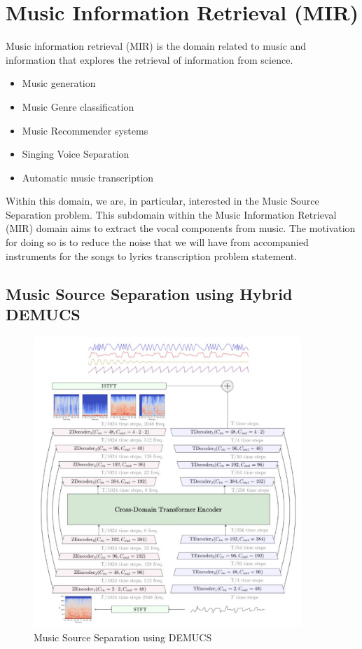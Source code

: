 \section{Music Information Retrieval (MIR)}%
\label{sec:musicinformationretrieval}

Music information retrieval (MIR) is the domain related to music and information that explores the retrieval of information from science.

\begin{itemize}
    \item Music generation
    \item Music Genre classification
    \item Music Recommender systems
    \item Singing Voice Separation
    \item Automatic music transcription

\end{itemize}

Within this domain, we are, in particular, interested in the Music Source Separation problem. This subdomain within the Music Information Retrieval (MIR) domain aims to extract the vocal components from music. The motivation for doing so is to reduce the noise that we will have from accompanied instruments for the songs to lyrics transcription problem statement.

\subsection{Music Source Separation using Hybrid DEMUCS}%
\label{sec:demucs}

\begin{figure} [H]
    \centering
    \includegraphics[width=0.9\textwidth]{03-Theoretical Foundations/figures/demucs.pdf}
    \caption{Music Source Separation using DEMUCS}
    \label{fig:demucs}
\end{figure}


